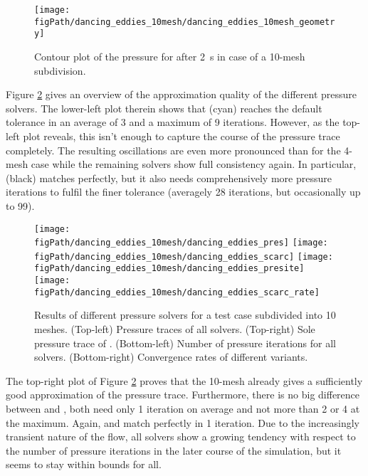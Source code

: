 \begin{figure}[ht]
\begin{center}
\texttt{[image: \\figPath/dancing\_eddies\_10mesh/dancing\_eddies\_10mesh\_geometry]}
\end{center}
\caption[Results of the {} test cases with 10 meshes]{Contour plot of the pressure for \uscarc{} after 2~s in case of a 10-mesh subdivision.}
\label{FIG_scarc_dancing_eddies_ten}
\end{figure}

Figure \ref{FIG_scarc_dancing_eddies_ten_convergence} gives an overview of the approximation quality of the different pressure solvers.
The lower-left plot therein shows that  \fftdefault{} (cyan) reaches the default tolerance  in an average of 3 and a maximum of 9 iterations.
However, as the top-left plot reveals, this isn't enough to capture the course of the pressure trace completely. The resulting oscillations are even more pronounced than for the 4-mesh case while the remaining solvers show full consistency again.
In particular, \ffttight{} (black) matches perfectly, but it also needs comprehensively more pressure iterations to fulfil the finer tolerance (averagely 28 iterations, but occasionally up to 99). %

\begin{figure}[ht]
\begin{center}
\texttt{[image: \\figPath/dancing\_eddies\_10mesh/dancing\_eddies\_pres]}
\texttt{[image: \\figPath/dancing\_eddies\_10mesh/dancing\_eddies\_scarc]}
\texttt{[image: \\figPath/dancing\_eddies\_10mesh/dancing\_eddies\_presite]}
\texttt{[image: \\figPath/dancing\_eddies\_10mesh/dancing\_eddies\_scarc\_rate]}
\end{center}
\caption[Results for a 10-mesh computation of the {} case]{Results of different pressure solvers for a  {} test case subdivided into 10 meshes. (Top-left) Pressure traces of all solvers. (Top-right) Sole pressure trace of \scarcdefault{}.
(Bottom-left) Number of pressure iterations for all solvers.
(Bottom-right) Convergence rates of different \scarc{} variants. }
\label{FIG_scarc_dancing_eddies_ten_convergence}
\end{figure}

The top-right plot of Figure \ref{FIG_scarc_dancing_eddies_ten_convergence} proves that the 10-mesh \scarcdefault{} already gives a sufficiently good approximation of the pressure trace.
Furthermore, there is no big difference between \scarcdefault{} and \scarctight{}, both need only 1 iteration on average and not more than 2 or 4 at the maximum. Again, \uscarc{} and \uglmat{} match perfectly in 1 iteration.
Due to the increasingly transient nature of the flow, all solvers show a growing tendency 
with respect to the number of pressure iterations in the later course of the simulation, but it seems to stay within bounds for all.

